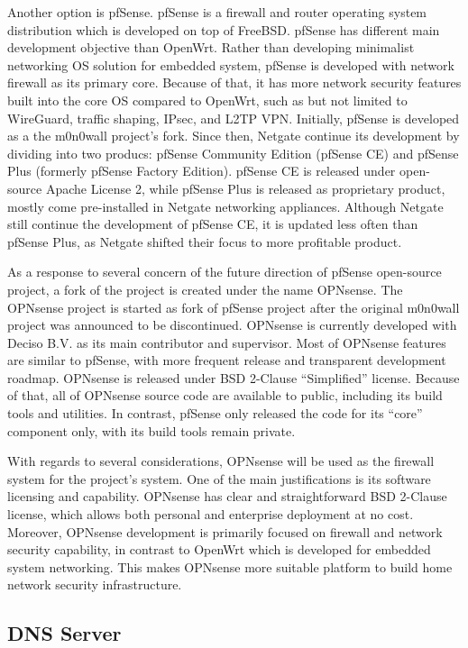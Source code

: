 \documentclass[../index.tex]{subfiles}
\begin{document}
Another option is pfSense. pfSense is a firewall and router operating system distribution which is
developed on top of FreeBSD. pfSense has different main development objective than OpenWrt. Rather
than developing minimalist networking OS solution for embedded system, pfSense is developed with
network firewall as its primary core. Because of that, it has more network security features built
into the core OS compared to OpenWrt, such as but not limited to WireGuard, traffic shaping, IPsec,
and L2TP VPN. Initially, pfSense is developed as a the m0n0wall project’s fork. Since then, Netgate
continue its development by dividing into two producs: pfSense Community Edition (pfSense CE) and
pfSense Plus (formerly pfSense Factory Edition). pfSense CE is released under open-source Apache
License 2, while pfSense Plus is released as proprietary product, mostly come pre-installed in
Netgate networking appliances. Although Netgate still continue the development of pfSense CE, it is
updated less often than pfSense Plus, as Netgate shifted their focus to more profitable product.

As a response to several concern of the future direction of pfSense open-source project, a fork of
the project is created under the name OPNsense. The OPNsense project is started as fork of pfSense
project after the original m0n0wall project was announced to be discontinued. OPNsense is currently
developed with Deciso B.V. as its main contributor and supervisor. Most of OPNsense features are
similar to pfSense, with more frequent release and transparent development roadmap. OPNsense is
released under BSD 2-Clause “Simplified” license. Because of that, all of OPNsense source code are
available to public, including its build tools and utilities. In contrast, pfSense only released the
code for its “core” component only, with its build tools remain private.

With regards to several considerations, OPNsense will be used as the firewall system for the
project’s system. One of the main justifications is its software licensing and capability. OPNsense
has clear and straightforward BSD 2-Clause license, which allows both personal and enterprise
deployment at no cost. Moreover, OPNsense development is primarily focused on firewall and network
security capability, in contrast to OpenWrt which is developed for embedded system networking. This
makes OPNsense more suitable platform to build home network security infrastructure.

\subsection{DNS Server}
\end{document}
